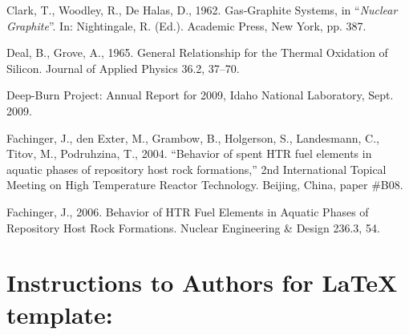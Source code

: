\documentclass[3p,times,procedia]{elsarticle}
\begin{document}







 \begin{thebibliography}{}


Clark, T., Woodley, R., De Halas, D., 1962. Gas-Graphite Systems, in ``{\it Nuclear Graphite}''. 
In: Nightingale, R. (Ed.). Academic Press, New York, pp. 387.

Deal, B., Grove, A., 1965. General Relationship for the Thermal Oxidation of Silicon. Journal of Applied Physics 36.2, 37--70.

Deep-Burn Project: Annual Report for 2009, Idaho National Laboratory, Sept. 2009.

Fachinger, J., den Exter, M., Grambow, B., Holgerson, S., Landesmann, C., Titov, M., Podruhzina, T., 2004. ``Behavior of spent HTR fuel elements in aquatic phases of repository host rock formations,'' 2nd International Topical Meeting on High Temperature Reactor Technology. Beijing, China, paper \#B08. 

Fachinger, J., 2006. Behavior
of HTR Fuel Elements in Aquatic Phases of Repository Host Rock Formations. Nuclear Engineering \& Design 236.3,      54.

 \end{thebibliography}

\clearpage

\normalMode

\section*{Instructions to Authors for LaTeX template:}
\end{document}
